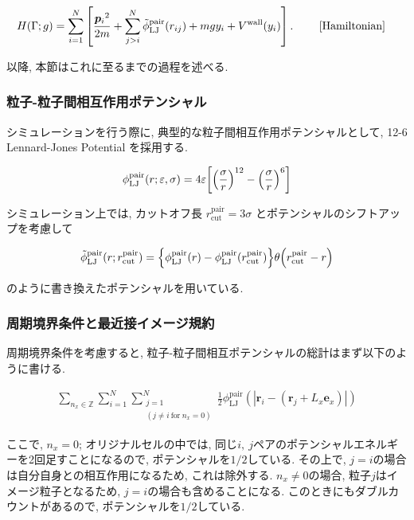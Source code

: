 \documentclass[dvipdfmx]{jsarticle}
\numberwithin{equation}{subsection}
\begin{document}
\begin{align}
  H(\Gamma; g)
  &= \sum_{i=1}^{N}
  \left[
    \frac{{\bm{p}_i}^2}{2m} 
    + \sum_{j > i}^{N}
      \tilde{\phi}_{\text{LJ}}^{\text{pair}}(r_{ij})
    + mgy_i
    + V^{\text{wall}} (y_i)
  \right] . \ \tag*{\eqref{Hamiltonian}} 
\end{align}

以降, 本節はこれに至るまでの過程を述べる.

\subsubsection{粒子-粒子間相互作用ポテンシャル}

シミュレーションを行う際に, 典型的な粒子間相互作用ポテンシャルとして, 12-6 Lennard-Jones Potential を採用する.

\begin{align}
  \phi_{\text{LJ}}^{\text{pair}}(r; \varepsilon, \sigma) = 4\varepsilon \qty[\qty(\frac{\sigma}{r})^{12} - \qty(\frac{\sigma}{r})^{6} ] \\
\end{align}

シミュレーション上では, カットオフ長 $r_{\text{cut}}^{\text{pair}}=3\sigma$ とポテンシャルのシフトアップを考慮して

\begin{align}
  \tilde{\phi}_{\text{LJ}}^{\text{pair}}(r;r_{\text{cut}}^{\text{pair}}) = \qty{\phi_{\text{LJ}}^{\text{pair}}(r) - \phi_{\text{LJ}}^{\text{pair}}(r_{\text{cut}}^{\text{pair}})}\theta \qty(r_{\text{cut}}^{\text{pair}}-r) \\
\end{align}

のように書き換えたポテンシャルを用いている.

\subsubsection{周期境界条件と最近接イメージ規約}

周期境界条件を考慮すると, 粒子-粒子間相互ポテンシャルの総計はまず以下のように書ける.

\begin{align}
  \sum_{n_x \in \mathbb{Z}} \sum_{i=1}^{N} \sum_{\substack{j=1 \\ (j \neq i \ \text{for} \ n_{x} = 0)}}^{N} \frac{1}{2} \phi_{\text{LJ}}^{\text{pair}}(|\bm{r}_i -(\bm{r}_j + L_x \bm{e}_x)|)
\end{align}

ここで, $n_x = 0$; オリジナルセルの中では, 同じ$i,\ j$ペアのポテンシャルエネルギーを2回足すことになるので, ポテンシャルを$1/2$している. その上で, $j = i$の場合は自分自身との相互作用になるため, これは除外する. $n_x \neq 0$の場合, 粒子$j$はイメージ粒子となるため, $j=i$の場合も含めることになる. このときにもダブルカウントがあるので, ポテンシャルを$1/2$している.
\end{document}
